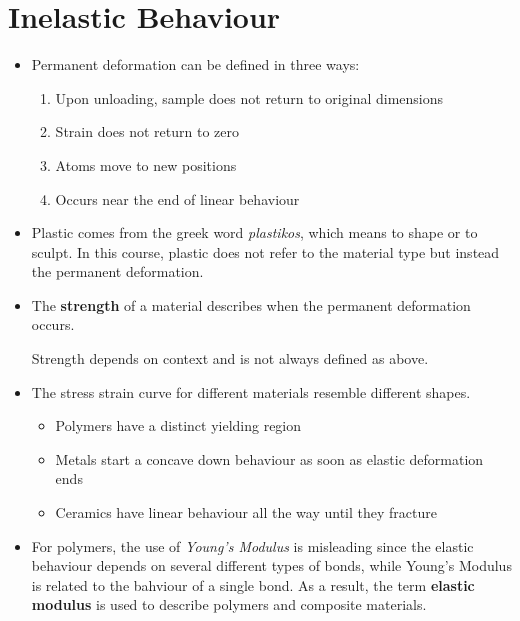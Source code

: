 \section{Inelastic Behaviour}
\begin{itemize}
    \item Permanent deformation can be defined in three ways:
    \begin{enumerate}
        \item Upon unloading, sample does not return to original dimensions
        \item Strain does not return to zero
        \item Atoms move to new positions
        \item Occurs near the end of linear behaviour
    \end{enumerate}
    \item Plastic comes from the greek word \textit{plastikos}, which means to shape or to sculpt. In this course, plastic does not refer to the material type but instead the permanent deformation.
    \item The \textbf{strength} of a material describes when the permanent deformation occurs.
    \begin{warning}
        Strength depends on context and is not always defined as above.
    \end{warning}
    \item The stress strain curve for different materials resemble different shapes.
    \begin{itemize}
        \item Polymers have a distinct yielding region
        \item Metals start a concave down behaviour as soon as elastic deformation ends
        \item Ceramics have linear behaviour all the way until they fracture
    \end{itemize}
    \begin{figure}[ht]
        \centering
    \end{figure}
    \item For polymers, the use of \textit{Young's Modulus} is misleading since the elastic behaviour depends on several different types of bonds, while Young's Modulus is related to the bahviour of a single bond. As a result, the term \textbf{elastic modulus} is used to describe polymers and composite materials.

\end{itemize}
